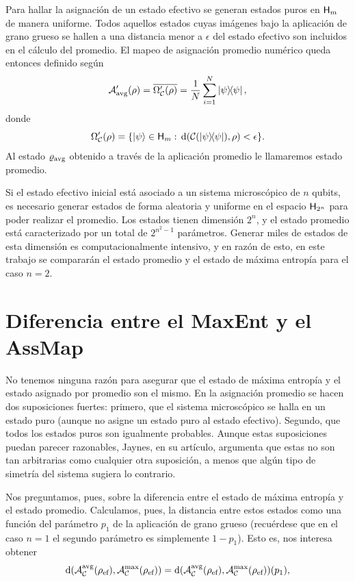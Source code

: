 Para hallar la asignación de un estado efectivo se generan estados puros en ${\sf H}_{m}$ de manera uniforme. Todos aquellos estados cuyas imágenes bajo la aplicación de grano grueso se hallen a una distancia menor a $\epsilon$ del estado efectivo son incluidos en el cálculo del promedio. El mapeo de asignación promedio numérico queda entonces definido según
\begin{equation}\label{eq:AvgMapNum}
    \mcA'_{\avg}(\rho) = \overline{\Omega'_{\mcC}(\rho)} = \frac{1}{N}\sum_{i=1}^{N}\dyad{\psi},
\end{equation}
donde
\begin{equation}\label{eq:OmegaNum}
    \Omega'_{\mcC}(\rho) = \{\ket{\psi}\in\hilbert_{m}:\, \text{d}(\mcC(\dyad{\psi}),\rho)<\epsilon  \}.
\end{equation}
Al estado $\varrho_{\text{avg}}$ obtenido a través de la aplicación promedio le llamaremos estado promedio.

Si el estado efectivo inicial está asociado a un sistema microscópico de $n$ qubits, es necesario generar estados de forma aleatoria y uniforme en el espacio ${\sf H}_{2^{n}}$ para poder realizar el promedio. Los estados tienen dimensión $2^{n}$, y el estado promedio está caracterizado por un total de $2^{n^{2}-1}$ parámetros. Generar miles de estados de esta dimensión es computacionalmente intensivo, y en razón de esto, en este trabajo se compararán el estado promedio y el estado de máxima entropía para el caso $n=2$.

\section{Diferencia entre el MaxEnt y el AssMap}


No tenemos ninguna razón para asegurar que el estado de máxima entropía y el estado asignado por promedio son el mismo. En la asignación promedio se hacen dos suposiciones fuertes: primero, que el sistema microscópico se halla en un estado puro (aunque no asigne un estado puro al estado efectivo). Segundo, que todos los estados puros son igualmente probables. Aunque estas suposiciones puedan parecer razonables, Jaynes, en su artículo, argumenta que estas no son tan arbitrarias como cualquier otra suposición, a menos que algún tipo de simetría del sistema sugiera lo contrario.

Nos preguntamos, pues, sobre la diferencia entre el estado de máxima entropía y el estado promedio. Calculamos, pues, la distancia entre estos estados como una función del parámetro $p_{1}$ de la aplicación de grano grueso (recuérdese que en el caso $n=1$ el segundo parámetro es simplemente $1-p_{1}$). Esto es, nos interesa obtener
\begin{equation}
    \text{d}\qty(\mathcal{A}_{\mathcal{C}}^{\text{avg}}(\rho_{\text{ef}}),\mathcal{A}_{\mathcal{C}}^{\max}(\rho_{\text{ef}}))=\text{d}\qty(\mathcal{A}_{\mathcal{C}}^{\text{avg}}(\rho_{\text{ef}}),\mathcal{A}_{\mathcal{C}}^{\max}(\rho_{\text{ef}}))(p_{1}),\nonumber
\end{equation}

